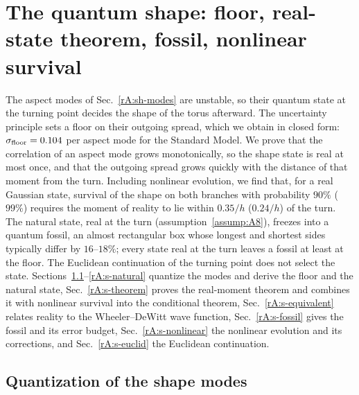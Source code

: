 \section{The quantum shape: floor, real-state theorem, fossil, nonlinear survival}\label{rep:quantum-shape}

The aspect modes of Sec.~\ref{rA:sh-modes} are unstable, so their quantum state at the turning point decides the shape of the torus afterward.
The uncertainty principle sets a floor on their outgoing spread, which we obtain in closed form: $\sigma_{\mathrm{floor}}=0.104$ per aspect mode for the Standard Model. %
We prove that the correlation of an aspect mode grows monotonically, so the shape state is real at most once, and that the outgoing spread grows quickly with the distance of that moment from the turn.
Including nonlinear evolution, we find that, for a real Gaussian state, survival of the shape on both branches with probability $90\%$ ($99\%$) requires the moment of reality to lie within $0.35/h$ ($0.24/h$) of the turn. %
The natural state, real at the turn (assumption~\ref{assump:A8}), freezes into a quantum fossil, an almost rectangular box whose longest and shortest sides typically differ by $16$--$18\%$; every state real at the turn leaves a fossil at least at the floor. %
The Euclidean continuation of the turning point does not select the state.
Sections~\ref{rA:s-quantization}--\ref{rA:s-natural} quantize the modes and derive the floor and the natural state, Sec.~\ref{rA:s-theorem} proves the real-moment theorem and combines it with nonlinear survival into the conditional theorem, Sec.~\ref{rA:s-equivalent} relates reality to the Wheeler--DeWitt wave function, Sec.~\ref{rA:s-fossil} gives the fossil and its error budget, Sec.~\ref{rA:s-nonlinear} the nonlinear evolution and its corrections, and Sec.~\ref{rA:s-euclid} the Euclidean continuation.

\subsection{Quantization of the shape modes}
\label{rA:s-quantization}

